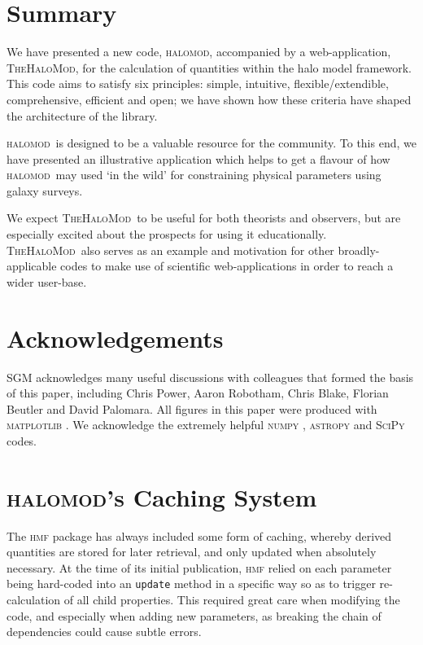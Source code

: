\documentclass[5p,aas_macros]{elsarticle}
\newcommand{\halomod}{\textsc{halomod}}
\newcommand{\thm}{\textsc{TheHaloMod}}
\begin{document}
\section{Summary}
\label{sec:summary}
We have presented a new code, \halomod, accompanied by a web-application, \thm, for the calculation of quantities within the halo model framework. This code aims to satisfy six principles: simple, intuitive, flexible/extendible, comprehensive, efficient and open; we have shown how these criteria have shaped the architecture of the library.

\halomod\  is designed to be a valuable resource for the community. 
To this end, we have presented an illustrative application which helps to get a flavour of how \halomod\ may used `in the wild' for constraining physical parameters using galaxy surveys.

We expect \thm\ to be useful for both theorists and observers, but are especially excited about the prospects for using it educationally. 
\thm\ also serves as an example and motivation for other broadly-applicable codes to make use of scientific web-applications in order to reach a wider user-base.

\section*{Acknowledgements}
SGM acknowledges many useful discussions with colleagues that formed the basis of this paper, including Chris Power, Aaron Robotham, Chris Blake, Florian Beutler and David Palomara. 
All figures in this paper were produced with \textsc{matplotlib} \citep{Hunter2007}. We acknowledge the extremely helpful \textsc{numpy} \citep{vanderWalt2011}, \textsc{astropy} \citep{Robitaille2013,AstropyCollaboration2018} and \textsc{SciPy} \citep{Virtanen2020} codes.




\appendix

\section{\textsc{halomod}'s Caching System}
\label{app:caching}

The \textsc{hmf} package has always included some form of caching, whereby derived quantities are stored for later retrieval, and only updated when absolutely necessary. At the time of its initial publication, \textsc{hmf} relied on each parameter being hard-coded into an \verb|update| method in a specific way so as to trigger re-calculation of all child properties. This required great care when modifying the code, and especially when adding new parameters, as breaking the chain of dependencies could cause subtle errors. 
\end{document}
